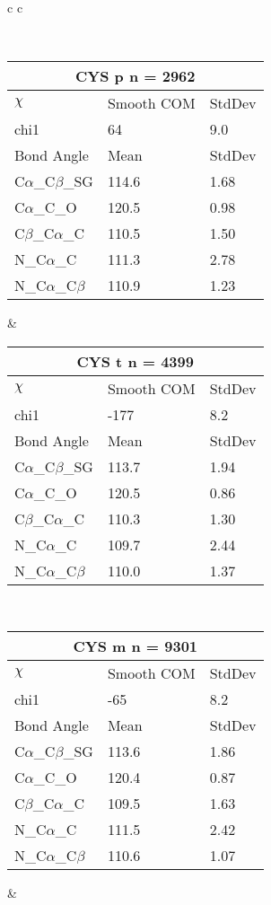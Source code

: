 \begin{longtable}{ c c }

\caption{CYS Central Values}\\
  \begin{tabular}{ l l l }
  \toprule
  \multicolumn{3}{c}{CYS \textbf{p} n = 2962} \\ \toprule
  $\chi$       & Smooth COM & StdDev \\ \midrule
  chi1 & 64 & 9.0 \\ \midrule
  Bond Angle   & Mean     & StdDev \\ \midrule
  C$\alpha$\_C$\beta$\_SG & 114.6 & 1.68\\
  C$\alpha$\_C\_O & 120.5 & 0.98\\
  C$\beta$\_C$\alpha$\_C & 110.5 & 1.50\\
  N\_C$\alpha$\_C & 111.3 & 2.78\\
  N\_C$\alpha$\_C$\beta$ & 110.9 & 1.23\\
  \bottomrule
  \end{tabular}
  &
  \begin{tabular}{ l l l }
  \toprule
  \multicolumn{3}{c}{CYS \textbf{t} n = 4399} \\ \toprule
  $\chi$       & Smooth COM & StdDev \\ \midrule
  chi1 & -177 & 8.2 \\ \midrule
  Bond Angle   & Mean     & StdDev \\ \midrule
  C$\alpha$\_C$\beta$\_SG & 113.7 & 1.94\\
  C$\alpha$\_C\_O & 120.5 & 0.86\\
  C$\beta$\_C$\alpha$\_C & 110.3 & 1.30\\
  N\_C$\alpha$\_C & 109.7 & 2.44\\
  N\_C$\alpha$\_C$\beta$ & 110.0 & 1.37\\
  \bottomrule
  \end{tabular}
  \\
  \begin{tabular}{ l l l }
  \toprule
  \multicolumn{3}{c}{CYS \textbf{m} n = 9301} \\ \toprule
  $\chi$       & Smooth COM & StdDev \\ \midrule
  chi1 & -65 & 8.2 \\ \midrule
  Bond Angle   & Mean     & StdDev \\ \midrule
  C$\alpha$\_C$\beta$\_SG & 113.6 & 1.86\\
  C$\alpha$\_C\_O & 120.4 & 0.87\\
  C$\beta$\_C$\alpha$\_C & 109.5 & 1.63\\
  N\_C$\alpha$\_C & 111.5 & 2.42\\
  N\_C$\alpha$\_C$\beta$ & 110.6 & 1.07\\
  \bottomrule
  \end{tabular}
  &
  \\
  
\end{longtable}

